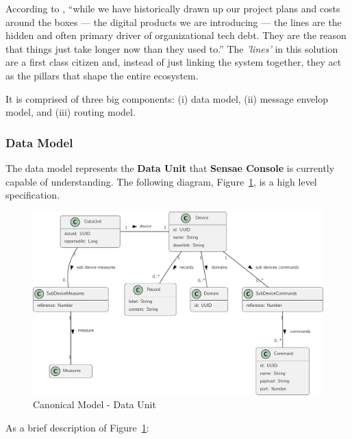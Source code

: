 According to \cite{integration}, ``while we have historically drawn up our project plans and costs around the boxes — the digital products we are introducing — the lines are the hidden and often primary driver of organizational tech debt. They are the reason that things just take longer now than they used to.'' The \textit{'lines'} in this solution are a first class citizen and, instead of just linking the system together, they act as the pillars that shape the entire ecosystem.

It is comprised of three big components: (i) data model, (ii) message envelop model, and (iii) routing model.

\subsubsection{Data Model}
\label{subsubsec:design:domain:shared_model:data}

The data model represents the \textbf{Data Unit} that \textbf{Sensae Console} is currently capable of understanding. The following diagram, Figure~\ref{fig:design:domain:shared_model:data:diagram}, is a high level specification.

\begin{figure}[H]
   \centering
   \includegraphics[page=1,width=\columnwidth]{assets/diagrams/design/domain/shared-model.pdf}
  \caption[Canonical Model - Data Unit]{Canonical Model - Data Unit}
  \label{fig:design:domain:shared_model:data:diagram}
\end{figure}

As a brief description of Figure~\ref{fig:design:domain:shared_model:data:diagram}:

